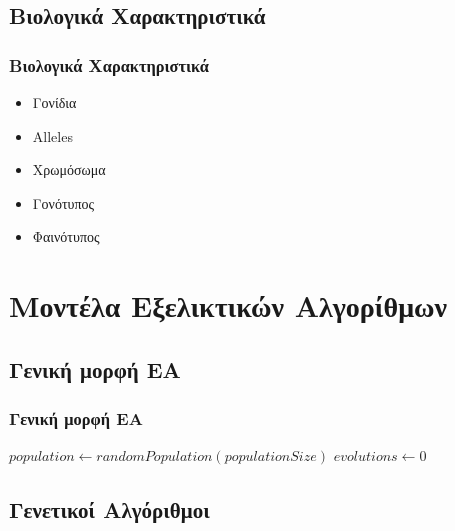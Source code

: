 \documentclass[xetex,mathserif,serif,14pt]{beamer}
\begin{document}
\subsection{Βιολογικά Χαρακτηριστικά}

\begin{frame}
\frametitle{Βιολογικά Χαρακτηριστικά}
    \begin{itemize}
      \item Γονίδια\pause
      \item Alleles\pause
      \item Χρωμόσωμα\pause
      \item Γονότυπος\pause
      \item Φαινότυπος
    \end{itemize}
\end{frame}

\section{Μοντέλα Εξελικτικών Αλγορίθμων}

\subsection{Γενική μορφή ΕΑ}

\begin{frame}
\frametitle{Γενική μορφή ΕΑ}
\centering
\begin{algorithm}[H]
    $population \gets randomPopulation(populationSize)$\;
    $evolutions \gets 0$\;
    \;
\end{algorithm}
\end{frame}

\subsection{Γενετικοί Αλγόριθμοι}
\end{document}
